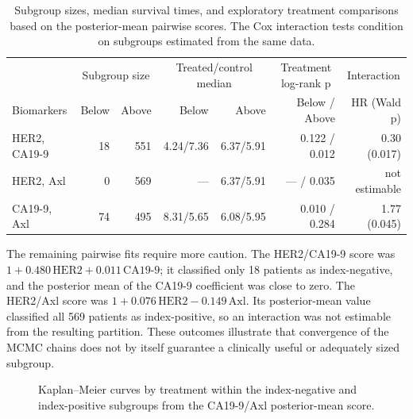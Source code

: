 \begin{table}[!htbp]
\caption[Subgroup sizes and exploratory survival comparisons]{Subgroup sizes,
median survival times, and exploratory treatment comparisons based on the
posterior-mean pairwise scores. The Cox interaction tests condition on
subgroups estimated from the same data.}
\label{tab:pairwiseSurvival}
\centering
\scriptsize
\begin{tabular}{lrrrrrr}
\toprule
& \multicolumn{2}{c}{Subgroup size}
& \multicolumn{2}{c}{Treated/control median}
& \multicolumn{1}{c}{Treatment log-rank p}
& \multicolumn{1}{c}{Interaction} \\
\cmidrule(lr){2-3}\cmidrule(lr){4-5}
Biomarkers & Below & Above & Below & Above & Below / Above & HR (Wald p) \\
\midrule
HER2, CA19-9 & 18 & 551 & 4.24/7.36 & 6.37/5.91 & 0.122 / 0.012 & 0.30 (0.017) \\
HER2, Axl    &  0 & 569 & ---         & 6.37/5.91 & --- / 0.035   & not estimable \\
CA19-9, Axl  & 74 & 495 & 8.31/5.65 & 6.08/5.95 & 0.010 / 0.284 & 1.77 (0.045) \\
\bottomrule
\end{tabular}
\end{table}

The remaining pairwise fits require more caution. The HER2/CA19-9 score
was $1+0.480\,\mathrm{HER2}+0.011\,\mathrm{CA19\mbox{-}9}$; it classified
only 18 patients as index-negative, and the posterior mean of the CA19-9
coefficient was close to zero. The HER2/Axl score was
$1+0.076\,\mathrm{HER2}-0.149\,\mathrm{Axl}$. Its posterior-mean value
classified all 569 patients as index-positive, so an interaction was not
estimable from the resulting partition. These outcomes illustrate that
convergence of the MCMC chains does not by itself guarantee a clinically
useful or adequately sized subgroup.

\begin{figure}[!htbp]
\centering
{}
\caption[Kaplan--Meier curves for the CA19-9/Axl model]{Kaplan--Meier curves
by treatment within the index-negative and index-positive subgroups from the
CA19-9/Axl posterior-mean score.}
\label{fig:caAxlKM}
\end{figure}

